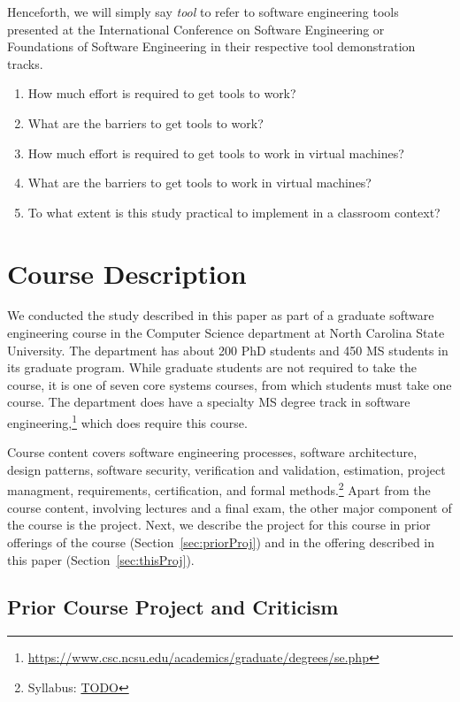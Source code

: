 \documentclass{sig-alternate-05-2015}
\begin{document}
Henceforth, we will simply say \textit{tool}
to refer to software engineering tools presented at
the International Conference on Software Engineering
or Foundations of Software Engineering in their
respective tool demonstration tracks.

\begin{enumerate}
  \item How much effort is required to get tools to work?
  \item What are the barriers to get tools to work?
  \item How much effort is required to get tools to work in virtual machines?
  \item What are the barriers to get tools to work in virtual machines?
  \item To what extent is this study practical to implement in a classroom context?
\end{enumerate}

\section{Course Description}

We conducted the study described in this paper as 
part of a graduate software engineering course
in the Computer Science department at 
North Carolina State University.
The department has about 200 PhD students and 450
MS students in its graduate program.
While graduate students are not required to
take the course, it is one of seven core systems
courses, from which students must take one course.
The department does have a specialty MS degree
track in software 
engineering,\footnote{\url{https://www.csc.ncsu.edu/academics/graduate/degrees/se.php}}
which does require this course.

Course content covers software engineering processes,
software architecture, design patterns, software security,
verification and validation, estimation, project managment,
requirements, certification, and formal 
methods.\footnote{Syllabus: \url{TODO}}
Apart from the course content, involving lectures and
a final exam, the other
major component of the course is the project.
Next, we describe the project for this course 
in prior offerings of the course (Section~\ref{sec:priorProj})
and in the offering described in this paper (Section~\ref{sec:thisProj}).

\subsection{Prior Course Project and Criticism}
\end{document}

